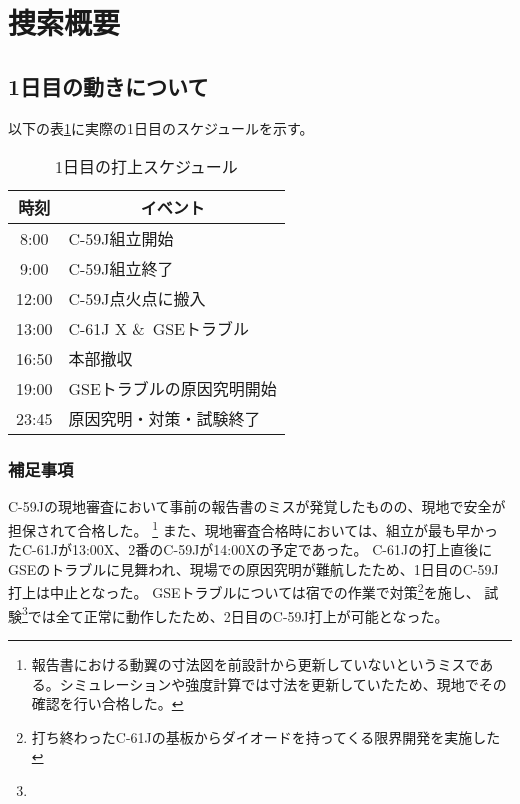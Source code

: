 \documentclass[a4paper,11pt,titlepage,uplatex]{jsarticle}
\begin{document}
\newpage
\section{捜索概要}

\subsection{1日目の動きについて}
以下の表\ref{tab:search_1nitime}に実際の1日目のスケジュールを示す。

\begin{table}[H]
    \centering
    \caption{1日目の打上スケジュール}
    \begin{tabular}{cl} \toprule
        時刻 & \multicolumn{1}{c}{イベント}  \\ \midrule
        8:00 & C-59J組立開始 \\
        9:00 & C-59J組立終了 \\
        12:00 & C-59J点火点に搬入 \\
        13:00 & C-61J X \&\ GSEトラブル \\
        16:50 & 本部撤収 \\
        19:00 & GSEトラブルの原因究明開始 \\
        23:45 & 原因究明・対策・試験終了 \\
        \bottomrule
    \end{tabular}
    \label{tab:search_1nitime}
\end{table}
\subsubsection*{補足事項}

C-59Jの現地審査において事前の報告書のミスが発覚したものの、現地で安全が担保されて合格した。
\footnote{報告書における動翼の寸法図を前設計から更新していないというミスである。シミュレーションや強度計算では寸法を更新していたため、現地でその確認を行い合格した。}
また、現地審査合格時においては、組立が最も早かったC-61Jが13:00X、2番のC-59Jが14:00Xの予定であった。
C-61Jの打上直後にGSEのトラブルに見舞われ、現場での原因究明が難航したため、1日目のC-59J打上は中止となった。
GSEトラブルについては{\color{red}宿での作業で}対策\footnote{{\color{red}打ち終わったC-61Jの基板からダイオードを持ってくる限界開発を実施した}}を施し、
試験\footnote{}では全て正常に動作したため、2日目のC-59J打上が可能となった。
\end{document}
